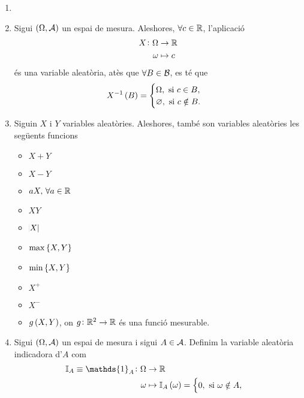 \begin{example}
    \begin{enumerate}[1.]
        \item[]
        \item Sigui $\left( \Omega, \mathcal{A}\right)$ un espai de mesura. Aleshores, $\forall c\in\mathbb{R}$, l'aplicació
            \begin{align*}
                X\colon \Omega &\to\mathbb{R}\\
                \omega &\mapsto c
            \end{align*}
            és una variable aleatòria, atès que $\forall B\in\mathcal{B}$, es té que
            \[
                X^{-1}\left( B\right)=\begin{cases}
                    \Omega, \text{ si } c\in B,\\
                    \varnothing, \text{ si } c\notin B.
                \end{cases}
            \]
        \item Siguin $X$ i $Y$ variables aleatòries. Aleshores, també son variables aleatòries les següents funcions
            \begin{itemize}
                \item $X+Y$
                \item $X-Y$
                \item $aX,\,\forall a\in\mathbb{R}$
                \item $XY$
                \item $\abs{X}$
                \item $\max\left\{ X, Y\right\}$
                \item $\min\left\{ X, Y\right\}$
                \item $X^+$
                \item $X^-$
                \item $g\left( X, Y\right)$, on $g\colon \mathbb{R}^2\to\mathbb{R}$ és una funció mesurable.
            \end{itemize}
        \item Sigui $\left( \Omega, \mathcal{A}\right)$ un espai de mesura i sigui $A\in\mathcal{A}$. Definim la variable aleatòria indicadora d'$A$ com
            \begin{align*}
                \mathbb{I}_A\equiv\mathds{1}_A\colon \Omega &\to\real\\
                \omega &\mapsto\mathbb{I}_A\lp\omega\rp=\begin{cases}
                    0, \text{ si } \omega\notin A,\\

\end{cases}
\end{align*}
\end{enumerate}
\end{example}
